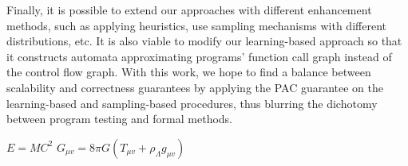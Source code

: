 Finally, it is possible to extend our approaches with different enhancement methods, such as applying heuristics, use sampling mechanisms with different distributions, etc. It is also viable to modify our learning-based approach so that it constructs automata approximating programs' function call graph instead of the control flow graph. With this work, we hope to find a balance between scalability and correctness guarantees by applying the PAC guarantee on the learning-based and sampling-based procedures, thus blurring the dichotomy between program testing and formal methods. 

$E = MC^2$
$G_{\mu v} = 8 \pi G(T_{\mu v}+ \rho_\Lambda g_{\mu v})$

\begin{comment}

The number of iterations is perhaps the most important factor in our
recursion analysis technique (Table~\ref{table:experiments}) as it would
determine how many times of unwinding are applied.
We find that \textsc{CPAchecker} performs poorly when checking programs
that is unwound many times.
We however do not enable the more efficient block encoding in
\textsc{CPAchecker} for the ease of implementation.
One can improve the performance of our algorithm with the efficient but
complicated block encoding.
A bounded analyzer may also speed up the verification of bounded properties.

Our algorithm extracts function summaries from inductive invariants.
There are certainly many heuristics to optimize the computation of
function summaries.
For instance, some program analyzers return error traces when properties fail.
In particular, a valuation of formal parameters is obtained when
\textmd{CheckSummary} (Algorithm~\ref{algorithm:check-summary}) returns $\FF$.
If the valuation is not possible in the $\fun{main}$ function, one can use
its inductive invariant to refine function summaries.
We in fact exploit error traces computed by \textsc{CPAchecker} in the
implementation.

Another improvement on our algorithm is on selecting locations for extracting
inductive invariants.
In Algorithm~\ref{algorithm:mark-locations}, we select only outermost pairs of
locations for calls to the same function.
This is based on the observation that the unwound bodies of these function calls
contain more execution paths,
and hence their behaviors should be closer to the original function.
However, the extracted invariants in $s_i$ may be too precise to those certain
function calls and result in too coarse summary candidates constructed by
implication connective,
and consequently the candidates can not pass \textmd{CheckSummary} due to inner
function calls are not properly approximated.
Therefore, heuristics that select some locations of inner function calls may help
compute summary candidates with better quality.


\end{comment}
